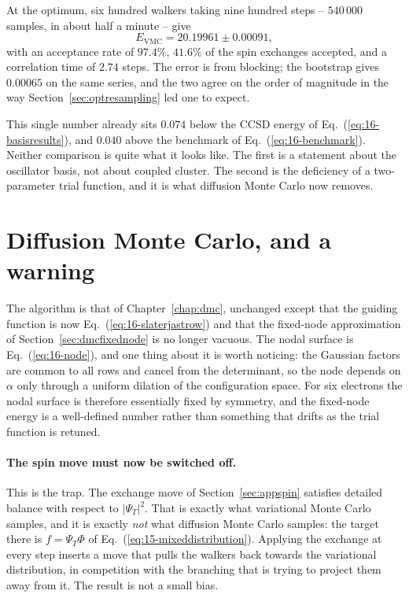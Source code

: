 At the optimum, six hundred walkers taking nine hundred steps -- $540\,000$
samples, in about half a minute -- give
\begin{equation}
  E_{\mathrm{VMC}} = 20.19961 \pm 0.00091 ,
  \label{eq:16-vmc}
\end{equation}
with an acceptance rate of $97.4\%$, $41.6\%$ of the spin exchanges accepted,
and a correlation time of $2.74$ steps.  The error is from blocking; the
bootstrap gives $0.00065$ on the same series, and the two agree on the order of
magnitude in the way Section~\ref{sec:optresampling} led one to expect.

This single number already sits $0.074$ below the CCSD energy of
Eq.~(\ref{eq:16-basisresults}), and $0.040$ above the benchmark of
Eq.~(\ref{eq:16-benchmark}).  Neither comparison is quite what it looks like.
The first is a statement about the oscillator basis, not about coupled cluster.
The second is the deficiency of a two-parameter trial function, and it is what
diffusion Monte Carlo now removes.

\section{Diffusion Monte Carlo, and a warning}
\label{sec:appdmc}

The algorithm is that of Chapter~\ref{chap:dmc}, unchanged except that the
guiding function is now Eq.~(\ref{eq:16-slaterjastrow}) and that the fixed-node
approximation of Section~\ref{sec:dmcfixednode} is no longer vacuous.  The
nodal surface is Eq.~(\ref{eq:16-node}), and one thing about it is worth
noticing: the Gaussian factors are common to all rows and cancel from the
determinant, so the node depends on $\alpha$ only through a uniform dilation
of the configuration space.  For six electrons the nodal surface is therefore
essentially fixed by symmetry, and the fixed-node energy is a well-defined
number rather than something that drifts as the trial function is retuned.

\paragraph{The spin move must now be switched off.}
This is the trap.  The exchange move of Section~\ref{sec:appspin} satisfies
detailed balance with respect to $|\Psi_T|^2$.  That is exactly what
variational Monte Carlo samples, and it is exactly \emph{not} what diffusion
Monte Carlo samples: the target there is $f=\Psi_T\Phi$ of
Eq.~(\ref{eq:15-mixeddistribution}).  Applying the exchange at every step
inserts a move that pulls the walkers back towards the variational
distribution, in competition with the branching that is trying to project them
away from it.  The result is not a small bias.


